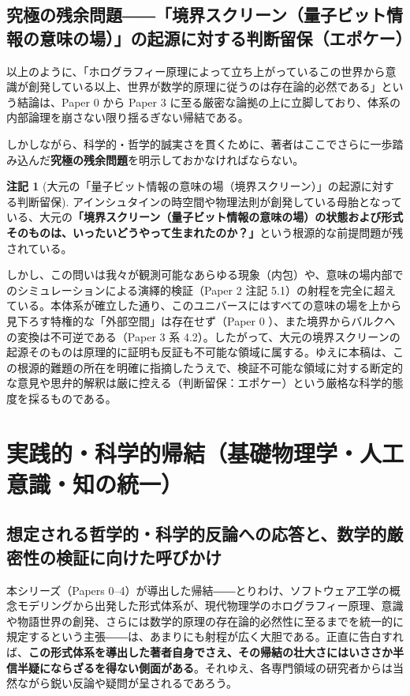 \documentclass[11pt,a4paper]{ltjsarticle}
\theoremstyle{definition}
\newtheorem{remark}{注記}[section]
\theoremstyle{plain}
\begin{document}
\subsection{究極の残余問題――「境界スクリーン（量子ビット情報の意味の場）」の起源に対する判断留保（エポケー）}
以上のように、「ホログラフィー原理によって立ち上がっているこの世界から意識が創発している以上、世界が数学的原理に従うのは存在論的必然である」という結論は、Paper 0 \cite{Ota2026_0} から Paper 3 \cite{Ota2026_3} に至る厳密な論拠の上に立脚しており、体系の内部論理を崩さない限り揺るぎない帰結である。

しかしながら、科学的・哲学的誠実さを貫くために、著者はここでさらに一歩踏み込んだ\textbf{究極の残余問題}を明示しておかなければならない。

\begin{remark}[大元の「量子ビット情報の意味の場（境界スクリーン）」の起源に対する判断留保]
アインシュタインの時空間や物理法則が創発している母胎となっている、大元の\textbf{「境界スクリーン（量子ビット情報の意味の場）の状態および形式そのものは、いったいどうやって生まれたのか？」}という根源的な前提問題が残されている。

しかし、この問いは我々が観測可能なあらゆる現象（内包）や、意味の場内部でのシミュレーションによる演繹的検証（Paper 2 \cite{Ota2026_2} 注記 5.1）の射程を完全に超えている。本体系が確立した通り、このユニバースにはすべての意味の場を上から見下ろす特権的な「外部空間」は存在せず（Paper 0 \cite{Ota2026_0}）、また境界からバルクへの変換は不可逆である（Paper 3 \cite{Ota2026_3} 系 4.2）。したがって、大元の境界スクリーンの起源そのものは原理的に証明も反証も不可能な領域に属する。ゆえに本稿は、この根源的難題の所在を明確に指摘したうえで、検証不可能な領域に対する断定的な意見や思弁的解釈は厳に控える（判断留保：エポケー）という厳格な科学的態度を採るものである。
\end{remark}

\section{実践的・科学的帰結（基礎物理学・人工意識・知の統一）}

\subsection{想定される哲学的・科学的反論への応答と、数学的厳密性の検証に向けた呼びかけ}
本シリーズ（Papers 0--4）が導出した帰結――とりわけ、ソフトウェア工学の概念モデリングから出発した形式体系が、現代物理学のホログラフィー原理、意識や物語世界の創発、さらには数学的原理の存在論的必然性に至るまでを統一的に規定するという主張――は、あまりにも射程が広く大胆である。正直に告白すれば、\textbf{この形式体系を導出した著者自身でさえ、その帰結の壮大さにはいささか半信半疑にならざるを得ない側面がある}。それゆえ、各専門領域の研究者からは当然ながら鋭い反論や疑問が呈されるであろう。
\end{document}
